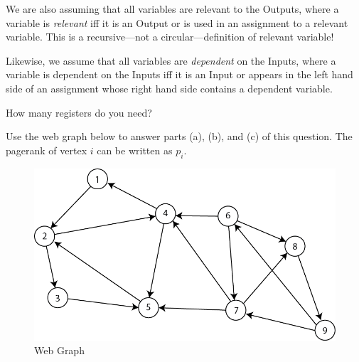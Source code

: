 \documentclass[12pt,twoside]{article}
\begin{document}
\begin{problem}{10}
{  We are also assuming that all variables are relevant to the Outputs,
  where a variable is \emph{relevant} iff it
  is an Output or is used in an assignment to a relevant variable.
  This is a recursive---not a circular---definition of relevant
  variable!

  Likewise, we assume that all variables are \emph{dependent} on the Inputs, where a variable is
  dependent on the Inputs iff it is an Input or appears in the left
  hand side of an assignment whose right hand side contains a
  dependent variable.
}

 How many registers
do you need?




\newpage



\begin{problem}{15} 
Use the web graph below to answer parts (a), (b), and (c) of this question. The pagerank of vertex $i$ can be written as $p_i$. 

\begin{figure}[!ht]
\begin{center}
\includegraphics[width=12cm]{pagerank.png}\end{center}
\caption{Web Graph}
\end{figure}


\end{problem}
\end{problem}
\end{document}
